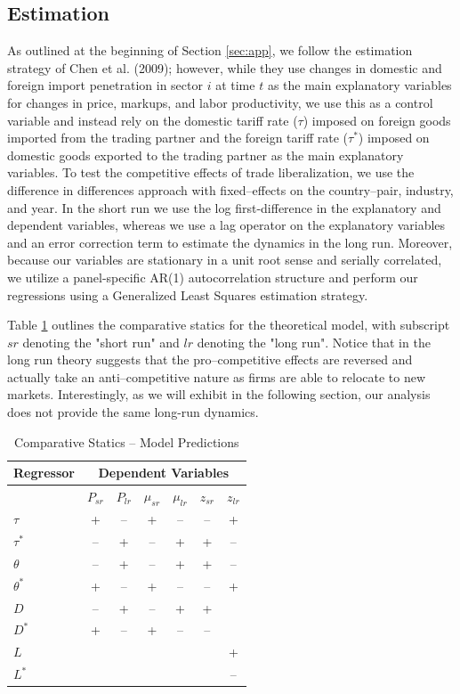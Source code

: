 \documentclass[a4paper,12pt]{article}
\begin{document}
\subsection{Estimation}
As outlined at the beginning of Section \ref{sec:app}, we follow the estimation strategy of Chen et al. (2009); however, while they use changes in domestic and foreign import penetration in sector $i$ at time $t$ as the main explanatory variables for changes in price, markups, and labor productivity, we use this as a control variable and instead rely on the domestic tariff rate ($\tau$) imposed on foreign goods imported from the trading partner and the foreign tariff rate ($\tau^*$) imposed on domestic goods exported to the trading partner as the main explanatory variables. To test the competitive effects of trade liberalization, we use the difference in differences approach with fixed--effects on the country--pair, industry, and year. In the short run we use the log first-difference in the explanatory and dependent variables, whereas we use a lag operator on the explanatory variables and an error correction term to estimate the dynamics in the long run. Moreover, because our variables are stationary in a unit root sense and serially correlated, we utilize a panel-specific AR(1) autocorrelation structure and perform our regressions using a Generalized Least Squares estimation strategy. 

Table \ref{tb:comp_stats} outlines the comparative statics for the theoretical model, with subscript $sr$ denoting the "short run" and $lr$ denoting the "long run". Notice that in the long run theory suggests that the pro--competitive effects are reversed and actually take an anti--competitive nature as firms are able to relocate to new markets. Interestingly, as we will exhibit in the following section, our analysis does not provide the same long-run dynamics.

\begin{center}
\begin{table}[ht] \caption{Comparative Statics -- Model Predictions}\label{tb:comp_stats}
\vspace{0.5cm}
{\small
\hfill{}
\begin{tabular}{|l|c|c|c|c|c|c|}
\hline
\textbf{Regressor}& \multicolumn{6}{|c|}{\textbf{Dependent Variables}}\\
\cline{2-7}
\hline
& $P_{sr}$ & $P_{lr}$ & $\mu_{sr}$ & $\mu_{lr}$ & $z_{sr}$ & $z_{lr}$ \\ \hline
$\tau$ & + & -- & + & -- & -- & +\\ \hline
$\tau^*$  & -- & + & -- & + & + & --\\ \hline
$\theta$ & -- & + & -- & + & + & --\\ \hline
$\theta^*$ & + & -- & + & -- & -- & +\\ \hline
$D$  & -- & + & -- & + & + & \\ \hline
$D^*$ & + & -- & + & -- & -- &\\ \hline
$L$ & & & & & & + \\ \hline
$L^*$ & & & & & & -- \\
\hline
\end{tabular}}
\hfill{}
\end{table}
\end{center}
\end{document}
